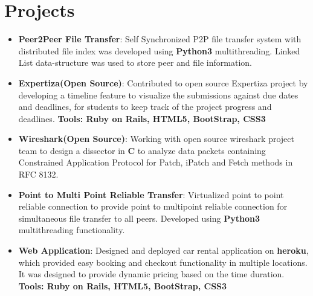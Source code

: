 \documentclass[letterpaper,11pt]{article}
\newcommand{\resumeItem}[2]{
  \item\small{
    \textbf{#1}{: #2 \vspace{-2pt}}
  }
}
\newcommand{\resumeSubItem}[2]{\resumeItem{#1}{#2}\vspace{-4pt}}
\newcommand{\resumeSubHeadingListStart}{\begin{itemize}[leftmargin=*]}
\newcommand{\resumeSubHeadingListEnd}{\end{itemize}}
\begin{document}
\section{Projects}
  \resumeSubHeadingListStart
    \resumeSubItem{Peer2Peer File Transfer}
      {Self Synchronized P2P file transfer system with distributed file index was developed using \textbf{Python3} multithreading. Linked List data-structure was used to store peer and file information.}
    \resumeSubItem{Expertiza(Open Source)}
      {Contributed to open source Expertiza project by developing a timeline feature to visualize the submissions against due dates and deadlines, for students to keep track of the project progress and deadlines. \textbf{Tools: Ruby on Rails, HTML5, BootStrap, CSS3}}
    \resumeSubItem{Wireshark(Open Source)}
      {Working with open source wireshark project team to design a dissector in \textbf{C} to analyze data packets containing Constrained Application Protocol for Patch, iPatch and Fetch methods in RFC 8132.}
    \resumeSubItem{Point to Multi Point Reliable Transfer}
      {Virtualized point to point reliable connection to provide point to multipoint reliable connection for simultaneous file transfer to all peers. Developed using \textbf{Python3} multithreading functionality.}
    \resumeSubItem{Web Application}
      {Designed and deployed car rental application on \textbf{heroku}, which provided easy booking and checkout functionality in multiple locations. It was designed to provide dynamic pricing based on the time duration. \textbf{Tools: Ruby on Rails, HTML5, BootStrap, CSS3}}
  \resumeSubHeadingListEnd


\end{document}
